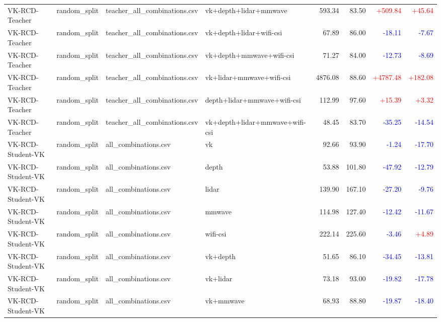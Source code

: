 \documentclass[10pt]{article}
\begin{document}
\begin{longtable}{llllrrrr}
VK-RCD-Teacher & random\_split & teacher\_all\_combinations.csv & vk+depth+lidar+mmwave & 593.34 & 83.50 & \textcolor{red}{+509.84} & \textcolor{red}{+45.64}\\
VK-RCD-Teacher & random\_split & teacher\_all\_combinations.csv & vk+depth+lidar+wifi-csi & 67.89 & 86.00 & \textcolor{blue}{-18.11} & \textcolor{blue}{-7.67}\\
VK-RCD-Teacher & random\_split & teacher\_all\_combinations.csv & vk+depth+mmwave+wifi-csi & 71.27 & 84.00 & \textcolor{blue}{-12.73} & \textcolor{blue}{-8.69}\\
VK-RCD-Teacher & random\_split & teacher\_all\_combinations.csv & vk+lidar+mmwave+wifi-csi & 4876.08 & 88.60 & \textcolor{red}{+4787.48} & \textcolor{red}{+182.08}\\
VK-RCD-Teacher & random\_split & teacher\_all\_combinations.csv & depth+lidar+mmwave+wifi-csi & 112.99 & 97.60 & \textcolor{red}{+15.39} & \textcolor{red}{+3.32}\\
VK-RCD-Teacher & random\_split & teacher\_all\_combinations.csv & vk+depth+lidar+mmwave+wifi-csi & 48.45 & 83.70 & \textcolor{blue}{-35.25} & \textcolor{blue}{-14.54}\\
VK-RCD-Student-VK & random\_split & all\_combinations.csv & vk & 92.66 & 93.90 & \textcolor{blue}{-1.24} & \textcolor{blue}{-17.70}\\
VK-RCD-Student-VK & random\_split & all\_combinations.csv & depth & 53.88 & 101.80 & \textcolor{blue}{-47.92} & \textcolor{blue}{-12.79}\\
VK-RCD-Student-VK & random\_split & all\_combinations.csv & lidar & 139.90 & 167.10 & \textcolor{blue}{-27.20} & \textcolor{blue}{-9.76}\\
VK-RCD-Student-VK & random\_split & all\_combinations.csv & mmwave & 114.98 & 127.40 & \textcolor{blue}{-12.42} & \textcolor{blue}{-11.67}\\
VK-RCD-Student-VK & random\_split & all\_combinations.csv & wifi-csi & 222.14 & 225.60 & \textcolor{blue}{-3.46} & \textcolor{red}{+4.89}\\
VK-RCD-Student-VK & random\_split & all\_combinations.csv & vk+depth & 51.65 & 86.10 & \textcolor{blue}{-34.45} & \textcolor{blue}{-13.81}\\
VK-RCD-Student-VK & random\_split & all\_combinations.csv & vk+lidar & 73.18 & 93.00 & \textcolor{blue}{-19.82} & \textcolor{blue}{-17.78}\\
VK-RCD-Student-VK & random\_split & all\_combinations.csv & vk+mmwave & 68.93 & 88.80 & \textcolor{blue}{-19.87} & \textcolor{blue}{-18.40}\\

\end{longtable}
\end{document}

